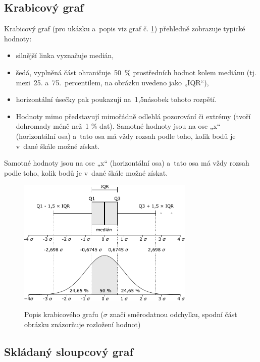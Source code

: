 \documentclass[12pt,a4paper,]{report}
\providecommand{\tightlist}{%
  \setlength{\itemsep}{0pt}\setlength{\parskip}{0pt}}
\begin{document}
\hypertarget{krabicovuxfd-graf}{%
\subsection{Krabicový graf}\label{krabicovuxfd-graf}}

Krabicový graf (pro ukázku a~popis viz graf č. \ref{fig:boxplotDesc}) přehledně zobrazuje typické hodnoty:

\begin{itemize}
\tightlist
\item
  silnější linka vyznačuje medián,
\item
  šedá, vyplněná část ohraničuje~50~\% prostředních hodnot kolem mediánu (tj. mezi~25. a~75.~percentilem, na obrázku uvedeno jako „IQR``),
\item
  horizontální úsečky pak poukazují na~1,5násobek tohoto rozpětí.
\item
  Hodnoty mimo představují mimořádně odlehlá pozorování či extrémy (tvoří dohromady méně než~1 \% dat).
  Samotné hodnoty jsou na ose „x`` (horizontální osa) a~tato osa má vždy rozsah podle toho, kolik bodů je v~dané škále možné získat.
\end{itemize}

Samotné hodnoty jsou na ose „x`` (horizontální osa) a~tato osa má vždy rozsah podle toho, kolik bodů je v~dané škále možné získat.

\begin{figure}
{\centering \includegraphics[width=0.75\textwidth]{figures/boxplot_description.pdf}}
\caption{Popis krabicového grafu ($\sigma$ značí směrodatnou odchylku, spodní část obrázku znázorňuje rozložení hodnot)}\label{fig:boxplotDesc}
\end{figure}

\hypertarget{skluxe1danuxfd-sloupcovuxfd-graf}{%
\subsection{Skládaný sloupcový graf}\label{skluxe1danuxfd-sloupcovuxfd-graf}}
\end{document}
